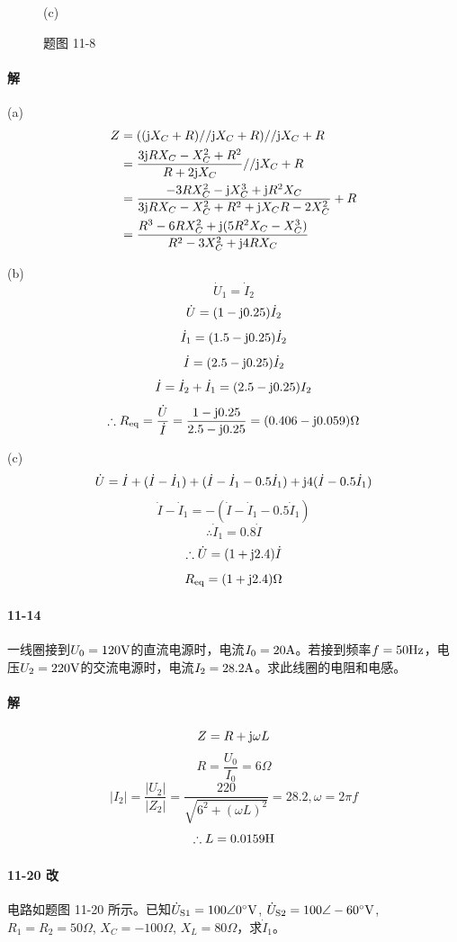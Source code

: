 \documentclass[hyperref, UTF8]{ctexart}
\newcommand{\volt}{{\rm V}}
\newcommand{\source}{{\rm S}}
\newcommand{\ampere}{{\rm A}}
\newcommand{\hertz}{{\rm Hz}}
\newcommand{\ohm}{\Omega}
\newcommand{\degree}{^{\circ}}
\newcommand{\henry}{{\rm H}}
\newcommand{\J}{{\rm j}}
\begin{document}
\begin{figure}[!htb]
\begin{minipage}[t]{0.312\textwidth}
\caption*{(c)}
\end{minipage}
\caption*{题图 11-8}
\end{figure}

\paragraph{解}
(a)
\begin{align*}
Z & = ((\J X_C+R) // \J X_C + R) // \J X_C + R \\
& = \frac{3\J R X_C - X_C^2 + R^2}{R + 2 \J X_C} // \J X_C + R \\
& = \frac{-3 R X_C^2 - \J X_C^3 + \J R^2 X_C}{3 \J R X_C - X_C^2 + R^2 + \J X_C R - 2 X_C^2} + R \\
& = \frac{R^3 - 6 R X_C^2 + \J (5 R^2 X_C - X_C^3)}{R^2 - 3 X_C^2+ \J 4R X_C}
\end{align*}

(b)
$$ \dot {U}_1 = \dot {I}_2 $$
$$ \dot {U} = (1 - \J 0.25) \dot I_2 $$
$$ \dot I_1 = (1.5 - \J 0.25) \dot I_2 $$
$$ \dot I = (2.5 - \J 0.25) \dot I_2 $$
$$ \dot I = \dot I_2 + \dot I_1 = (2.5-\J 0.25) I_2 $$
$$ \therefore R_{\rm eq} = \frac{\dot U}{\dot I} = \frac {1-\J 0.25}{2.5 - \J 0.25} = (0.406 - \J 0.059)\ohm$$

(c)
$$ \dot U = \dot I + (\dot I - \dot I_1) + (\dot I - \dot I_1 - 0.5 \dot I_1) + \J 4 (\dot I - 0.5 \dot I_1) $$
$$  \dot I - \dot I _1 = -( \dot I - \dot I _ 1 - 0.5 \dot I _1)  $$
$$ \therefore  \dot I _1 = 0.8 \dot I  $$
$$ \therefore  \dot U = (1+\J 2.4) \dot I $$
$$  R_{\rm eq} = (1+ \J 2.4)\ohm $$

\paragraph{11-14}\label{11-14}
一线圈接到$U_0=120\volt$的直流电源时，电流$I_0=20\ampere$。若接到频率$f=50\hertz$，电压$U_2=220\volt$的交流电源时，电流$I_2=28.2\ampere$。求此线圈的电阻和电感。

\paragraph{解}
$$ Z = R + \J \omega L $$
$$ R = \frac {U_0}{I_0} = 6 \ohm $$
$$ |I_2| = \frac{|U_2|}{|Z_2|} = \frac{220}{\sqrt{6^2 + (\omega L)^2}} = 28.2, \omega = 2\pi f $$
$$\therefore L = 0.0159 \henry $$

\paragraph{11-20 改}\label{11-20}
电路如题图 11-20 所示。已知$\dot{U}_{\source 1}=100\angle 0\degree \volt$, $\dot{U}_{\source 2}=100\angle -60\degree \volt$, $R_1=R_2=50\ohm$, $X_C=-100\ohm$, $X_L=80\ohm$，求$\dot{I}_1$。
\end{document}
